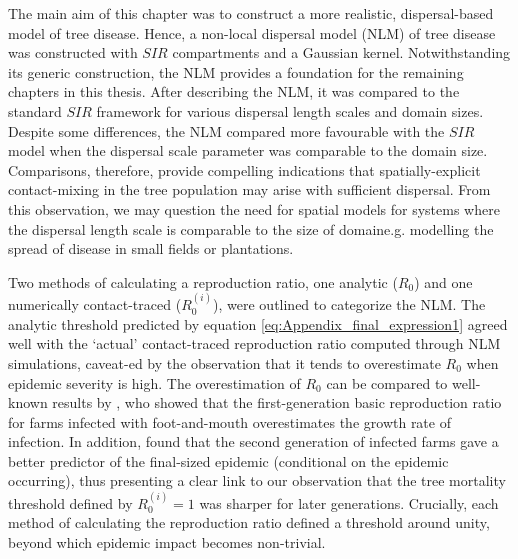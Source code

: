 The main aim of this chapter was to construct a more realistic, dispersal-based model of tree disease.
Hence, a non-local dispersal model (NLM) of tree disease was constructed with $SIR$ compartments and a Gaussian kernel.
Notwithstanding its generic construction, the NLM provides a foundation for the remaining chapters in this thesis.
After describing the NLM, it was compared to the standard $SIR$ framework for various dispersal length scales and domain sizes.
Despite some differences, the NLM compared more favourable with the $SIR$ model when the dispersal scale parameter was comparable to the domain size.
Comparisons, therefore, provide compelling indications that spatially-explicit contact-mixing in the tree population may arise with sufficient dispersal.
From this observation, we may question the need for spatial models for systems where the dispersal length scale is comparable to the size of domain\textemdash e.g. modelling the spread of disease in small fields or plantations.

Two methods of calculating a reproduction ratio, one analytic ($R_0$) and one numerically contact-traced ($R_0^{(i)}$), were outlined to categorize the NLM.
The analytic threshold predicted by equation \ref{eq:Appendix_final_expression1} agreed well with the `actual' contact-traced reproduction ratio computed through NLM simulations,
caveat-ed by the observation that it tends to overestimate $R_0$ when epidemic severity is high.
The overestimation of $R_0$ can be compared to well-known results by \cite{R0-perc-ref, doi:10.1098/rsif.2005.0051},
who showed that the first-generation basic reproduction ratio for farms infected with foot-and-mouth overestimates the growth rate of infection.
In addition, \cite{R0-perc-ref} found that the second generation of infected farms gave a better predictor of the final-sized epidemic (conditional on the epidemic occurring),
thus presenting a clear link to our observation that the tree mortality threshold defined by $R_0^{(i)}=1$ was sharper for later generations.
Crucially, each method of calculating the reproduction ratio defined a threshold around unity, beyond which epidemic impact becomes non-trivial.

